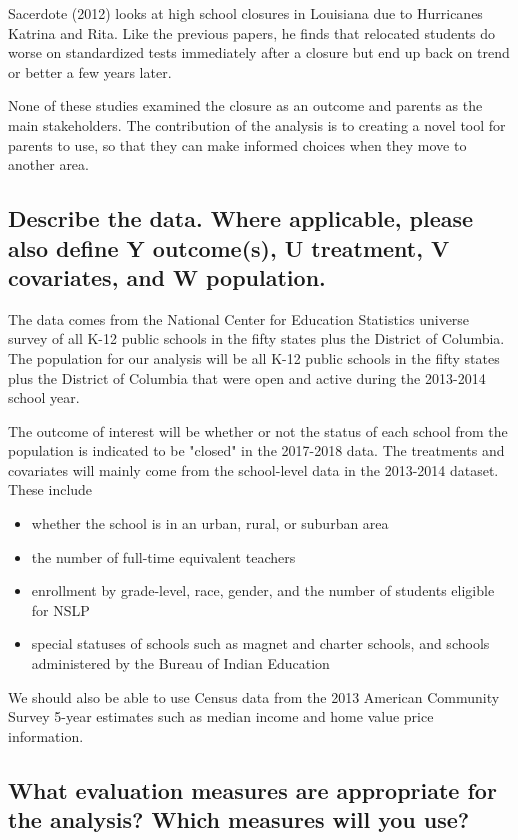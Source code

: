 \documentclass[twoside,11pt]{article}
\begin{document}
Sacerdote (2012) looks at high school closures in Louisiana due to Hurricanes Katrina and Rita. Like the previous papers, he finds that relocated students do worse on standardized tests immediately after a closure but end up back on trend or better a few years later. \cite{cite2}

None of these studies examined the closure as an outcome and parents as the main stakeholders. The contribution of the analysis is to creating a novel tool for parents to use, so that they can make informed choices when they move to another area. 


\subsection{Describe the data. Where applicable, please also define Y outcome(s), U treatment, V covariates, and W population.}

The data comes from the National Center for Education Statistics universe survey of all K-12 public schools in the fifty states plus the District of Columbia. The population for our analysis will be all K-12 public schools in the fifty states plus the District of Columbia that were open and active during the 2013-2014 school year. 

The outcome of interest will be whether or not the status of each school from the population is indicated to be "closed" in the 2017-2018 data.
The treatments and covariates will mainly come from the school-level data in the 2013-2014 dataset. These include 
\begin{itemize}
\item whether the school is in an urban, rural, or suburban area
\item the number of full-time equivalent teachers
\item enrollment by grade-level, race, gender, and the number of students eligible for NSLP
\item special statuses of schools such as magnet and charter schools, and schools administered by the Bureau of Indian Education
\end{itemize}
We should also be able to use Census data from the 2013 American Community Survey 5-year estimates such as median income and home value price information.


\subsection{What evaluation measures are appropriate for the analysis? Which measures will you use?}
\end{document}
